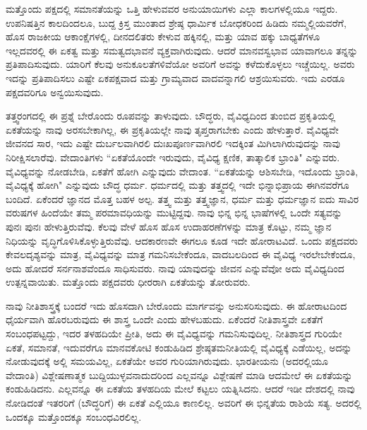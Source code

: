 ಮತ್ತೊಂದು ಪಕ್ಷದಲ್ಲಿ ಸಮಾನತೆಯನ್ನು ಒತ್ತಿ ಹೇಳುವವರ ಅನುಯಾಯಿಗಳು ಎಲ್ಲಾ ಕಾಲಗಳಲ್ಲಿಯೂ ಇದ್ದರು. ಉಪನಿಷತ್ತಿನ ಕಾಲದಿಂದಲೂ, ಬುದ್ದ ಕ್ರಿಸ್ತ ಮುಂತಾದ ಶ್ರೇಷ್ಠ ಧಾರ್ಮಿಕ ಬೋಧಕರಿಂದ ಹಿಡಿದು ನಮ್ಮಲ್ಲಿಯವರೆಗೆ, ಹೊಸ ರಾಜಕೀಯ ಆಕಾಂಕ್ಷೆಗಳಲ್ಲಿ, ದೀನದಲಿತರು ಕೇಳುವ ಹಕ್ಕಿನಲ್ಲಿ, ಮತ್ತು ಯಾವ ಹಕ್ಕು ಬಾಧ್ಯತೆಗಳೂ ಇಲ್ಲದವರಲ್ಲಿ ಈ ಏಕತ್ವ ಮತ್ತು ಸಮತ್ವದಭಾವನೆ ವ್ಯಕ್ತವಾಗಿರುವುದು. ಆದರೆ ಮಾನವಸ್ವಭಾವ ಯಾವಾಗಲೂ ತನ್ನನ್ನು ಪ್ರತಿಪಾದಿಸುವುದು. ಯಾರಿಗೆ ಕೆಲವು ಅನುಕೂಲತೆಗಳಿವೆಯೋ ಅವರಿಗೆ ಅವನ್ನು ಕಳೆದುಕೊಳ್ಳಲು ಇಚ್ಚೆಯಿಲ್ಲ. ಅವರು ಇದನ್ನು ಪ್ರತಿಪಾದಿಸಲು ಎಷ್ಟೇ ಏಕಪಕ್ಷವಾದ ಮತ್ತು ಗ್ರಾಮ್ಯವಾದ ವಾದವನ್ನಾಗಲಿ ಆಶ್ರಯಿಸುವರು. ಇದು ಎರಡೂ ಪಕ್ಷದವರಿಗೂ ಅನ್ವಯಿಸುವುದು.

ತತ್ತ್ವರಂಗದಲ್ಲಿ ಈ ಪ್ರಶ್ನೆ ಬೇರೊಂದು ರೂಪವನ್ನು ತಾಳುವುದು. ಬೌದ್ಧರು, ವೈವಿಧ್ಯದಿಂದ ತುಂಬಿದ ಪ್ರಕೃತಿಯಲ್ಲಿ ಏಕತೆಯನ್ನು ನಾವು ಅರಸಬೇಕಾಗಿಲ್ಲ, ಈ ಪ್ರಕೃತಿಯಲ್ಲೇ ನಾವು ತೃಪ್ತರಾಗಬೇಕು ಎಂದು ಹೇಳುತ್ತಾರೆ. ವೈವಿಧ್ಯವೇ ಜೀವನದ ಸಾರ, ಇದು ಎಷ್ಟೇ ದುರ್ಬಲವಾಗಿರಲಿ ದುಃಖಪೂರ್ಣವಾಗಿರಲಿ ಇದಕ್ಕಿಂತ ಮಿಗಿಲಾಗಿರುವುದನ್ನು ನಾವು ನಿರೀಕ್ಷಿಸಲಾರೆವು. ವೇದಾಂತಿಗಳು “ಏಕತೆಯೊಂದೇ ಇರುವುದು, ವೈವಿಧ್ಯ ಕ್ಷಣಿಕ, ತಾತ್ಕಾಲಿಕ ಭ್ರಾಂತಿ" ಎನ್ನುವರು. ವೈವಿಧ್ಯವನ್ನು ನೋಡಬೇಡಿ, ಏಕತೆಗೆ ಹೋಗಿ ಎನ್ನುವುದು ವೇದಾಂತ. “ಏಕತೆಯನ್ನು ಆಶಿಸಬೇಡಿ, ಇದೊಂದು ಭ್ರಾಂತಿ, ವೈವಿಧ್ಯಕ್ಕೆ ಹೋಗಿ" ಎನ್ನುವುದು ಬೌದ್ಧ ಧರ್ಮ. ಧರ್ಮದಲ್ಲಿ ಮತ್ತು ತತ್ತ್ವದಲ್ಲಿ ಇದೇ ಭಿನ್ನಾಭಿಪ್ರಾಯ ಈಗಿನವರೆಗೂ ಬಂದಿದೆ. ಏಕೆಂದರೆ ಜ್ಞಾನದ ಮೊತ್ತ ಬಹಳ ಅಲ್ಪ. ತತ್ತ್ವ ಮತ್ತು ತತ್ತ್ವಜ್ಞಾನ, ಧರ್ಮ ಮತ್ತು ಧರ್ಮಜ್ಞಾನ ಐದು ಸಾವಿರ ವರುಷಗಳ ಹಿಂದೆಯೇ ತಮ್ಮ ಪರಮಾವಧಿಯನ್ನು ಮುಟ್ಟಿದ್ದವು. ನಾವು ಭಿನ್ನ ಭಿನ್ನ ಭಾಷೆಗಳಲ್ಲಿ ಒಂದೇ ಸತ್ಯವನ್ನು ಪುನಃ ಪುನಃ ಹೇಳುತ್ತಿರುವೆವು. ಕೆಲವು ವೇಳೆ ಹೊಸ ಹೊಸ ಉದಾಹರಣೆಗಳನ್ನು ಮಾತ್ರ ಕೊಟ್ಟು, ನಮ್ಮ ಜ್ಞಾನ ನಿಧಿಯನ್ನು ವೃದ್ಧಿಗೊಳಿಸಿಕೊಳ್ಳುತ್ತಿರುವೆವು. ಆದಕಾರಣವೇ ಈಗಲೂ ಕೂಡ ಇದೇ ಹೋರಾಟವಿದೆ. ಒಂದು ಪಕ್ಷದವರು ಕೇವಲ\break ದೃಶ್ಯವನ್ನು ಮಾತ್ರ, ವೈವಿಧ್ಯವನ್ನು ಮಾತ್ರ ಗಮನಿಸಬೇಕೆಂದೂ, ವಾದಬಲದಿಂದ ಈ ವೈವಿಧ್ಯ ಇರಲೇಬೇಕೆಂದೂ, ಅದು ಹೋದರೆ ಸರ್ನನಾಶವೆಂದೂ ಸಾಧಿಸುವರು. ನಾವು ಯಾವುದನ್ನು ಜೀವನ ಎನ್ನುವೆವೋ ಅದು ವೈವಿಧ್ಯದಿಂದ ಉತ್ಪನ್ನವಾಯಿತು. ಮತ್ತೊಂದು ಪಕ್ಷದವರು ಧೀರರಾಗಿ ಏಕತೆಯನ್ನು ತೋರುವರು.

ನಾವು ನೀತಿಶಾಸ್ತ್ರಕ್ಕೆ ಬಂದರೆ ಇದು ಹೊಸದಾಗಿ ಬೇರೊಂದು ಮಾರ್ಗವನ್ನು ಅನುಸರಿಸುವುದು. ಈ ಹೋರಾಟದಿಂದ ಧೈರ್ಯವಾಗಿ ಹೊರಬರುವುದು ಈ ಶಾಸ್ತ್ರ ಒಂದೇ ಎಂದು ಹೇಳಬಹುದು. ಏಕೆಂದರೆ ನೀತಿಶಾಸ್ತ್ರವೇ ಏಕತೆಗೆ ಸಂಬಂಧಪಟ್ಟದ್ದು, ಇದರ ತಳಹದಿಯೇ ಪ್ರೀತಿ, ಅದು ಈ ವೈವಿಧ್ಯವನ್ನು ಗಮನಿಸುವುದಿಲ್ಲ. ನೀತಿಶಾಸ್ತ್ರದ ಗುರಿಯೇ ಏಕತೆ, ಸಮಾನತೆ, ಇದುವರೆಗೂ ಮಾನವಕೋಟಿ ಕಂಡುಹಿಡಿದ ಶ್ರೇಷ್ಠತಮನೀತಿಯಲ್ಲಿ ವೈವಿಧ್ಯಕ್ಕೆ ಎಡೆಯಿಲ್ಲ, ಅದನ್ನು ನೋಡುವುದಕ್ಕೆ ಅಲ್ಲಿ ಸಮಯವಿಲ್ಲ, ಏಕತೆಯೇ ಅವರ ಗುರಿಯಾಗಿರುವುದು. ಭಾರತೀಯನು (ಅದರಲ್ಲಿಯೂ ವೇದಾಂತಿ) ವಿಶ್ಲೇಷಣಾತ್ಮಕ ಬುದ್ದಿಯುಳ್ಳವನಾದುದರಿಂದ ಎಲ್ಲವನ್ನೂ ವಿಶ್ಲೇಷಣೆ ಮಾಡಿ ಆದಮೇಲೆ ಈ ಏಕತೆಯನ್ನು ಕಂಡುಹಿಡಿದನು. ಎಲ್ಲವನ್ನೂ ಈ ಏಕತೆಯ ತಳಹದಿಯ ಮೇಲೆ ಕಟ್ಟಲು ಯತ್ನಿಸಿದನು. ಆದರೆ ಇಡೀ ದೇಶದಲ್ಲಿ ನಾವು ನೋಡಿದಂತೆ ಇತರರಿಗೆ (ಬೌದ್ಧರಿಗೆ) ಈ ಏಕತೆ ಎಲ್ಲಿಯೂ ಕಾಣಲಿಲ್ಲ. ಅವರಿಗೆ ಈ ಭಿನ್ನತೆಯ ರಾಶಿಯೆ ಸತ್ಯ. ಅದರಲ್ಲಿ ಒಂದಕ್ಕೂ ಮತ್ತೊಂದಕ್ಕೂ ಸಂಬಂಧವಿರಲಿಲ್ಲ.

